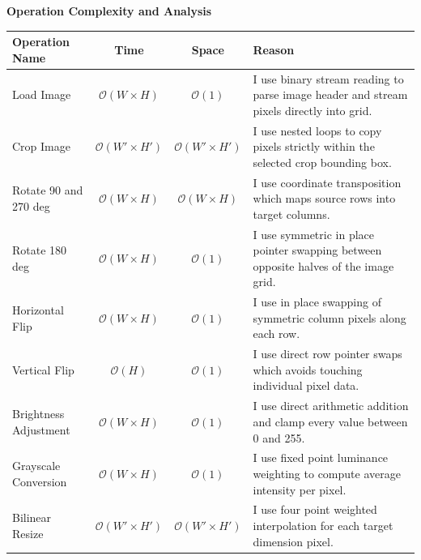 \documentclass[9.5pt,a4paper]{article}
\begin{document}
\clearpage


\begin{center}
    {\Large \textbf{Operation Complexity and Analysis}}
\end{center}

\vspace{0.08cm}
\begin{table}[h!]
\centering
\fontsize{7.5pt}{9.2pt}\selectfont
\begin{tabularx}{\textwidth}{l c c X}
\toprule
\textbf{Operation Name} & \textbf{Time} & \textbf{Space} & \textbf{Reason} \\
\midrule
Load Image & $\mathcal{O}(W \times H)$ & $\mathcal{O}(1)$ & I use binary stream reading to parse image header and stream pixels directly into grid. \\
\addlinespace[1pt]
Crop Image & $\mathcal{O}(W' \times H')$ & $\mathcal{O}(W' \times H')$ & I use nested loops to copy pixels strictly within the selected crop bounding box. \\
\addlinespace[1pt]
Rotate 90 and 270 deg & $\mathcal{O}(W \times H)$ & $\mathcal{O}(W \times H)$ & I use coordinate transposition which maps source rows into target columns. \\
\addlinespace[1pt]
Rotate 180 deg & $\mathcal{O}(W \times H)$ & $\mathcal{O}(1)$ & I use symmetric in place pointer swapping between opposite halves of the image grid. \\
\addlinespace[1pt]
Horizontal Flip & $\mathcal{O}(W \times H)$ & $\mathcal{O}(1)$ & I use in place swapping of symmetric column pixels along each row. \\
\addlinespace[1pt]
Vertical Flip & $\mathcal{O}(H)$ & $\mathcal{O}(1)$ & I use direct row pointer swaps which avoids touching individual pixel data. \\
\addlinespace[1pt]
Brightness Adjustment & $\mathcal{O}(W \times H)$ & $\mathcal{O}(1)$ & I use direct arithmetic addition and clamp every value between 0 and 255. \\
\addlinespace[1pt]
Grayscale Conversion & $\mathcal{O}(W \times H)$ & $\mathcal{O}(1)$ & I use fixed point luminance weighting to compute average intensity per pixel. \\
\addlinespace[1pt]
Bilinear Resize & $\mathcal{O}(W' \times H')$ & $\mathcal{O}(W' \times H')$ & I use four point weighted interpolation for each target dimension pixel. \\

\end{tabularx}
\end{table}
\end{document}

